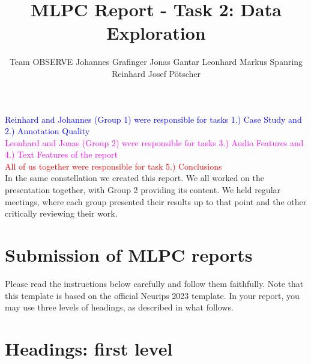 \documentclass{article}
\title{MLPC Report  - Task 2: Data Exploration}
\author{
  Team OBSERVE \AND
  Johannes Grafinger 
  \And
  Jonas Gantar 
  \And 
  Leonhard Markus Spanring 
  \And 
  Reinhard Josef Pötscher
}
\begin{document}
\maketitle
\begin{contributions}
  \textcolor{blue}{Reinhard and Johannes (Group 1) were responsible for tasks 1.) Case Study and 2.) Annotation Quality} \\ 
  \textcolor{magenta}{Leonhard and Jonas (Group 2) were responsible for tasks 3.) Audio Features and 4.) Text Features of the report} \\ 
  \textcolor{red}{All of us together were responsible for task 5.) Conclusions} \\ 
  In the same constellation we created this report. We all worked on the presentation together, with Group 2 providing its content. We held regular meetings, where each group presented their results up to that point and the other critically reviewing their work.
\end{contributions}























\section{Submission of MLPC reports}

Please read the instructions below carefully and follow them faithfully. Note that this template is based on the official Neurips 2023 template. In your report, you may use three levels of headings, as described in what follows. 

\section{Headings: first level}
\label{sec:headings}
\end{document}
